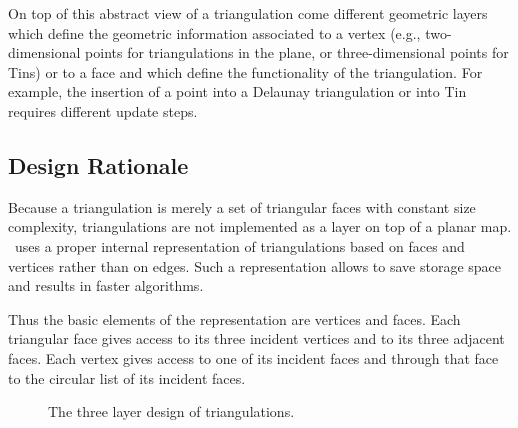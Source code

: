  On top of this  abstract  view of a triangulation come different
geometric layers which define  the geometric information
associated to a vertex (e.g.,  two-dimensional points for triangulations
in the plane, or three-dimensional points for {\sc Tin}s) or to a face
and which define the functionality of the triangulation. 
For example, the insertion of a point into a Delaunay
triangulation or into  {\sc Tin} requires different update steps.


\subsection*{Design Rationale}
Because a triangulation is merely a set of
triangular faces with constant size complexity,
triangulations are not implemented
as a layer on top of a planar map.
\cgal\ uses a proper internal
representation of triangulations based on faces and vertices
rather than on edges. Such a representation
allows to save storage space and results in faster
algorithms.

Thus the basic elements of the representation are vertices and faces.
Each triangular face gives access to its three incident vertices 
and to its three adjacent faces. 
Each vertex gives access to one of its incident faces
and through that face to the circular list of its incident faces.

\begin{ccTexOnly}
  \begin{figure}
    \begin{center}
     
    \end{center}
	\caption{The three layer design of triangulations.}
    \label{I1_Fig_three_levels}
  \end{figure}
\end{ccTexOnly}


